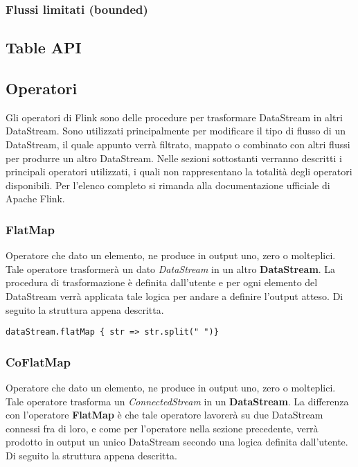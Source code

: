 \subsubsection{Flussi limitati (bounded)}

\subsection{Table API}

\subsection{Operatori}
Gli operatori di Flink sono delle procedure per trasformare DataStream in altri DataStream. Sono utilizzati principalmente per modificare il tipo di flusso di un DataStream, il quale appunto verrà filtrato, mappato o combinato con altri flussi per produrre un altro DataStream. Nelle sezioni sottostanti verranno descritti i principali operatori utilizzati, i quali non rappresentano la totalità degli operatori disponibili. Per l'elenco completo si rimanda alla documentazione ufficiale di Apache Flink.

\subsubsection{FlatMap}
Operatore che dato un elemento, ne produce in output uno, zero o molteplici. Tale operatore trasformerà un dato \textit{DataStream} in un altro \textbf{DataStream}. La procedura di trasformazione è definita dall'utente e per ogni elemento del DataStream verrà applicata tale logica per andare a definire l'output atteso. Di seguito la struttura appena descritta.

\begin{verbatim}
dataStream.flatMap { str => str.split(" ")}
\end{verbatim}
	
	
\subsubsection{CoFlatMap}
Operatore che dato un elemento, ne produce in output uno, zero o molteplici. Tale operatore trasforma un \textit{ConnectedStream} in un \textbf{DataStream}. La differenza con l'operatore \textbf{FlatMap} è che tale operatore lavorerà su due DataStream connessi fra di loro, e come per l'operatore nella sezione precedente, verrà prodotto in output un unico DataStream secondo una logica definita dall'utente. Di seguito la struttura appena descritta.

